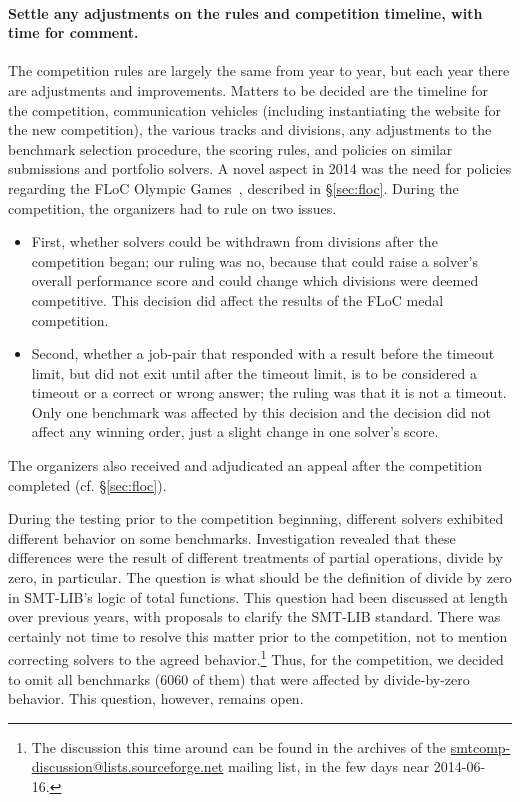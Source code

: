 \documentclass[twoside,11pt]{article}
\begin{document}
\paragraph{Settle any adjustments on the rules and competition timeline, with time for comment.} 
The competition rules are largely the same from year to year, but each year there are adjustments and improvements. Matters to be decided are the timeline for the competition, communication vehicles (including instantiating the website for the new competition), the various tracks and divisions, any adjustments to the benchmark selection procedure, the scoring rules, and policies on similar submissions and portfolio solvers. A novel aspect in 2014 was the need for policies regarding the FLoC Olympic Games~\cite{FLoCGames}, described in \S\ref{sec:floc}. During the competition, the organizers had to rule on two issues. 
\begin{itemize}[noitemsep,nolistsep]
\item First, whether solvers could be withdrawn from divisions after the competition began; our ruling was no, because that could raise a solver's overall performance score and could change which divisions were deemed competitive. This decision did affect the results of the FLoC medal competition.
\item Second, whether a job-pair that responded with a result before the timeout limit, but did not exit until after the timeout limit, is to be considered a timeout or a correct or wrong answer; the ruling was that it is not a timeout. Only one benchmark was affected by this decision and the decision did not affect any winning order, just a slight change in one solver's score.
\end{itemize}
The organizers also received and adjudicated an appeal after the competition completed (cf. \S\ref{sec:floc}).

During the testing prior to the competition beginning, different solvers exhibited different behavior on some benchmarks. Investigation revealed that these differences were the result of different treatments of partial operations, divide by zero, in particular. The question is what should be the definition of divide by zero in SMT-LIB's logic of total functions. This question had been discussed at length over previous years, with proposals to clarify the SMT-LIB standard.
There was certainly not time to resolve this matter prior to the competition, not to mention correcting solvers to the agreed behavior.\footnote{The discussion this time around can be found in the archives of the \url{smtcomp-discussion@lists.sourceforge.net} mailing list, in the few days near 2014-06-16.}
Thus, for the competition, we decided to omit all benchmarks (6060 of them) that were affected by divide-by-zero behavior. This question, however, remains open.
\end{document}
